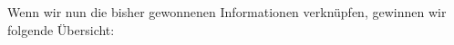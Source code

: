 %
%
%


Wenn wir nun die bisher gewonnenen Informationen verknüpfen, gewinnen wir folgende Übersicht:


